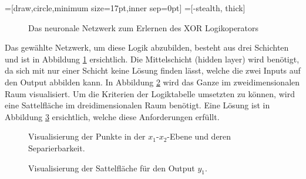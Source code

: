 =[draw,circle,minimum size=17pt,inner sep=0pt]
=[-stealth, thick]
\begin{figure}
	\centering
	\caption{Das neuronale Netzwerk zum Erlernen des XOR Logikoperators}
	\label{ableitung:fig:nn-result-net}
\end{figure}
Das gewählte Netzwerk, um diese Logik abzubilden, besteht aus drei
Schichten und ist in Abbildung \ref{ableitung:fig:nn-result-net}
ersichtlich.
Die Mittelschicht (hidden layer) wird benötigt, da sich mit nur
%
%
einer Schicht keine Lösung finden lässt, welche die zwei Inputs auf den Output abbilden kann.
In Abbildung \ref{ableitung:fig:visualisation-surface} wird das Ganze im zweidimensionalen Raum visualisiert.
Um die Kriterien der Logiktabelle umsetzten zu können, wird eine Sattelfläche im dreidimensionalen Raum benötigt. Eine Lösung ist in Abbildung \ref{ableitung:fig:visualisation-surface-2} ersichtlich, welche diese Anforderungen erfüllt.
\begin{figure}
	\centering
		
		\caption{Visualisierung der Punkte in der $x_1$-$x_2$-Ebene und deren
		Separierbarkeit.}
	\label{ableitung:fig:visualisation-surface}
\end{figure}
\begin{figure}
	\centering
	
	\caption{Visualisierung der Sattelfläche für den Output $y_1$.}
	\label{ableitung:fig:visualisation-surface-2}
\end{figure}

